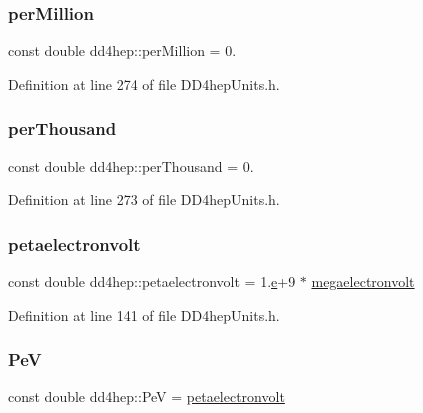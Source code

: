\subsubsection{\texorpdfstring{per\+Million}{perMillion}}
{\footnotesize\ttfamily const double dd4hep\+::per\+Million = 0.\hspace{0.3cm}{\ttfamily [static]}}



Definition at line 274 of file D\+D4hep\+Units.\+h.

\hypertarget{namespacedd4hep_ab0f604563df4dec531bdb35bd2f97a6f}{}\label{namespacedd4hep_ab0f604563df4dec531bdb35bd2f97a6f} 
\subsubsection{\texorpdfstring{per\+Thousand}{perThousand}}
{\footnotesize\ttfamily const double dd4hep\+::per\+Thousand = 0.\hspace{0.3cm}{\ttfamily [static]}}



Definition at line 273 of file D\+D4hep\+Units.\+h.

\hypertarget{namespacedd4hep_a096cb423758a909c122182a3eed457d1}{}\label{namespacedd4hep_a096cb423758a909c122182a3eed457d1} 
\subsubsection{\texorpdfstring{petaelectronvolt}{petaelectronvolt}}
{\footnotesize\ttfamily const double dd4hep\+::petaelectronvolt = 1.\hyperlink{_volumes_8cpp_a8a9a1f93e9b09afccaec215310e64142}{e}+9 $\ast$ \hyperlink{namespacedd4hep_a4e39beba039f7a6bda24a7031c121b2a}{megaelectronvolt}\hspace{0.3cm}{\ttfamily [static]}}



Definition at line 141 of file D\+D4hep\+Units.\+h.

\hypertarget{namespacedd4hep_ae90286dc351bfa44df11c5ebf9dbdbe9}{}\label{namespacedd4hep_ae90286dc351bfa44df11c5ebf9dbdbe9} 
\subsubsection{\texorpdfstring{PeV}{PeV}}
{\footnotesize\ttfamily const double dd4hep\+::\+PeV = \hyperlink{namespacedd4hep_a096cb423758a909c122182a3eed457d1}{petaelectronvolt}\hspace{0.3cm}{\ttfamily [static]}}




